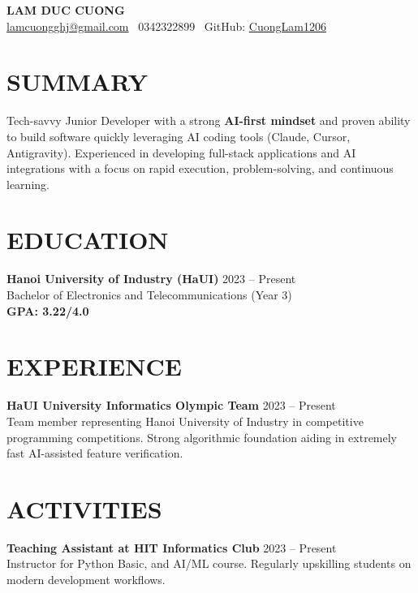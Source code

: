 \documentclass[10pt, a4paper]{article}
\begin{document}
\begin{center}
    \textbf{\Large LAM DUC CUONG} \\
    \href{mailto:lamcuongghj@gmail.com}{lamcuongghj@gmail.com} \textbar \ 0342322899 \textbar \ GitHub: \href{https://github.com/CuongLam1206}{CuongLam1206}
\end{center}

\section*{SUMMARY}
\noindent Tech-savvy Junior Developer with a strong \textbf{AI-first mindset} and proven ability to build software quickly leveraging AI coding tools (Claude, Cursor, Antigravity). Experienced in developing full-stack applications and AI integrations with a focus on rapid execution, problem-solving, and continuous learning.

\section*{EDUCATION}
\noindent\textbf{Hanoi University of Industry (HaUI)} \hfill 2023 -- Present \\
Bachelor of Electronics and Telecommunications (Year 3) \\
\textbf{GPA: 3.22/4.0}

\section*{EXPERIENCE}
\noindent\textbf{HaUI University Informatics Olympic Team} \hfill 2023 -- Present \\
Team member representing Hanoi University of Industry in competitive programming competitions. Strong algorithmic foundation aiding in extremely fast AI-assisted feature verification.

\section*{ACTIVITIES}
\noindent\textbf{Teaching Assistant at HIT Informatics Club} \hfill 2023 -- Present \\
Instructor for Python Basic, and AI/ML course. Regularly upskilling students on modern development workflows.

\end{document}
